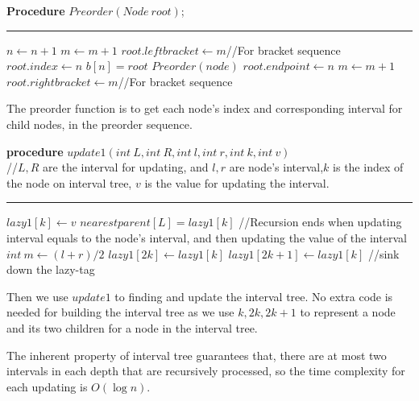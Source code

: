\begin{algorithm}
	\label{alg:preorder}
	\textbf{Procedure} $Preorder(Node~root)$;
	\hrule
	$n \leftarrow n+1$\;
	$m \leftarrow m+1$
	$root.leftbracket \leftarrow m${\color{gray}//For bracket sequence}\;
	$root.index \leftarrow n$\;
	$b[n]=root$\;
	{
		$Preorder(node)$
	}
	$root.endpoint \leftarrow n$\;
	$m \leftarrow m+1$\;
	$root.rightbracket \leftarrow m${\color{gray}//For bracket sequence}\;
\end{algorithm}
The preorder function is to get each node's index and corresponding interval for child nodes, in the preorder sequence.
\begin{algorithm}
	\textbf{procedure} $update1(int~L,int ~R, int~l, int~r, int~k, int~v)${\color{gray}
		\\//$L,R$ are the interval for updating, and $l,r$ are node's interval,$k$ is the index of the node on interval tree, $v$ is the value for updating the interval.}
	\hrule
	{
		 {$lazy1[k] \leftarrow v$}
		 {$nearestparent[L] = lazy1[k]$}
		{\color{gray}
		//Recursion ends when updating interval equals to the node's interval, and then updating the value of the interval}
	}
	{
		$int~m \leftarrow (l+r)/2$\;
		 {$lazy1[2k] \leftarrow lazy1[k]$}
		 {$lazy1[2k+1] \leftarrow lazy1[k]${\color{gray}
			//sink down the lazy-tag}}
	}
\end{algorithm}
Then we use $update1$ to finding and update the interval tree. No extra code is needed for building the interval tree as we use $k,2k,2k+1$ to represent a node and its two children for a node in the interval tree.

The inherent property of interval tree guarantees that, there are at most two intervals in each depth that are recursively processed, so the time complexity for each updating is $O(\log n)$.

